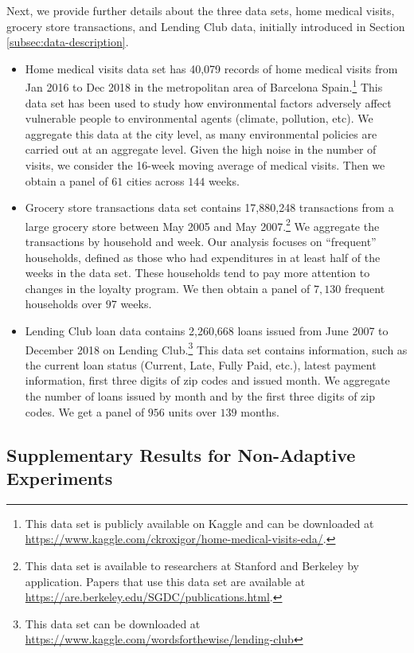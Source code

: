 Next, we provide further details about the three data sets, home medical visits, grocery store transactions, and Lending Club data, initially introduced in Section \ref{subsec:data-description}.
\begin{itemize}
    \item Home medical visits data set has 40,079 records of home medical visits from Jan 2016 to Dec 2018 in the metropolitan area of Barcelona Spain.\footnote{This data set is publicly available on Kaggle and can be downloaded at \url{https://www.kaggle.com/ckroxigor/home-medical-visits-eda/}.} This data set has been used to study how environmental factors adversely affect vulnerable people to environmental agents (climate, pollution, etc). We aggregate this data at the city level, as many environmental policies are carried out at an aggregate level. Given the high noise in the number of visits, we consider the 16-week moving average of medical visits. Then we obtain a panel of $61$ cities across $144$ weeks.


\item Grocery store transactions data set contains 17,880,248 transactions from a large grocery store between May 2005 and May 2007.\footnote{This data set is available to researchers at Stanford and Berkeley by application. Papers that use this data set are available at \url{https://are.berkeley.edu/SGDC/publications.html}.} We aggregate the transactions by household and week. Our analysis focuses on ``frequent'' households, defined as those who had expenditures in at least half of the weeks in the data set. These households tend to pay more attention to changes in the loyalty program. We then obtain a panel of $7,130$ frequent households over $97$ weeks. 


\item Lending Club loan data contains 2,260,668 loans issued from June 2007 to December 2018 on Lending Club.\footnote{This data set can be downloaded at \url{https://www.kaggle.com/wordsforthewise/lending-club}}   This data set contains information, such as the current loan status (Current, Late, Fully Paid, etc.), latest payment information, first three digits of zip codes and issued month. We aggregate the number of loans issued by month and by the first three digits of zip codes. We get a panel of $956$ units over $139$ months.

\end{itemize}



\subsection{Supplementary Results for Non-Adaptive Experiments}


